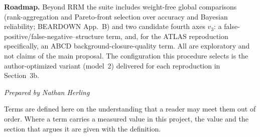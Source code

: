 \documentclass[11pt]{article}
\newcommand{\preparedby}{%
  \par\nobreak\vspace{-6pt}%
  {\footnotesize\itshape\color{forgemute}Prepared by Nathan Herling}%
  \par\vspace{4pt}}
\begin{document}
\smallskip
\noindent\textbf{Roadmap.} Beyond RRM the suite includes weight-free global comparisons (rank-aggregation and Pareto-front selection over accuracy and Bayesian reliability; BEARDOWN App.~B) and two candidate fourth axes $v_3$: a false-positive/false-negative--structure term, and, for the ATLAS reproduction specifically, an ABCD background-closure-quality term. All are exploratory and not claims of the main proposal. The configuration this procedure selects is the author-optimized variant (model~2) delivered for each reproduction in Section~3b.

%
\preparedby
\newsection

Terms are defined here on the understanding that a reader may meet them out of
order. Where a term carries a measured value in this project, the value and the
section that argues it are given with the definition.
\end{document}
